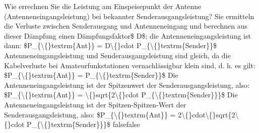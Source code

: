     {Wie errechnen Sie die Leistung am Einspeisepunkt der Antenne (Antenneneingangsleistung) bei bekannter Senderausgangsleistung?}
    {Sie ermitteln die Verluste zwischen Senderausgang und Antenneneingang und berechnen aus dieser Dämpfung einen Dämpfungsfaktor\$ D\$; die Antenneneingangsleistung ist dann: \$P\_\{\textbackslash\{\}textrm\{Ant\}\} = D\textbackslash\{\}cdot P\_\{\textbackslash\{\}textrm\{Sender\}\}\$}
    {Antenneneingangsleistung und Senderausgangsleistung sind gleich, da die Kabelverluste bei Amateurfunkstationen vernachlässigbar klein sind, d. h. es gilt: \$P\_\{\textbackslash\{\}textrm\{Ant\}\} = P\_\{\textbackslash\{\}textrm\{Sender\}\}\$}
    {Die Antenneneingangsleistung ist der Spitzenwert der Senderausgangsleistung, also: \$P\_\{\textbackslash\{\}textrm\{Ant\}\} = \textbackslash\{\}sqrt\{2\textbackslash\{\}cdot P\_\{\textbackslash\{\}textrm\{Sender\}\}\}\$}
    {Die Antenneneingangsleistung ist der Spitzen-Spitzen-Wert der Senderausgangsleistung, also: \$P\_\{\textbackslash\{\}textrm\{Ant\}\} = 2\textbackslash\{\}cdot\textbackslash\{\}sqrt\{2\textbackslash\{\}cdot P\_\{\textbackslash\{\}textrm\{Sender\}\}\}\$}
    {false}{false}